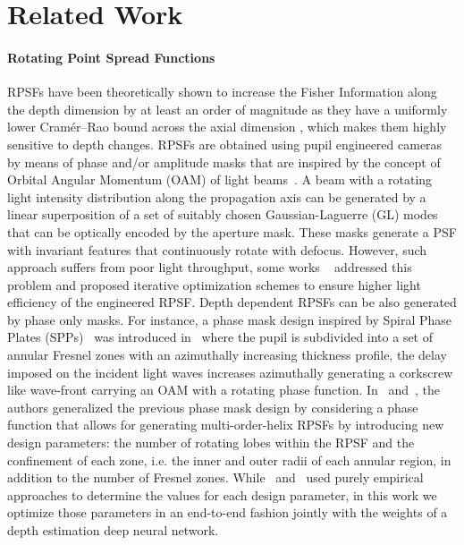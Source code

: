 \documentclass[preprint,5p,twocolumn]{elsarticle}
\begin{document}
 \section{Related Work}
\label{sec:related}






\paragraph{Rotating Point Spread Functions}
\label{parag:1}
RPSFs have been theoretically shown to increase the Fisher Information along the depth dimension by at least an order of magnitude as they have a uniformly lower Cramér–Rao bound across the axial dimension \cite{greengard2006depth}, which makes them highly sensitive to depth changes. RPSFs are obtained using pupil engineered cameras by means of phase and/or amplitude masks that are inspired by the concept of Orbital Angular Momentum (OAM) of light beams~\cite{allen1992orbital}. A beam with a rotating light intensity distribution along the propagation axis can be generated by a linear superposition of a set of suitably chosen Gaussian-Laguerre (GL) modes~\cite{piestun2000propagation,greengard2006depth} that can be optically encoded by the aperture mask. These masks generate a PSF with invariant features that continuously rotate with defocus. However, such approach suffers from poor light throughput, some works  ~\cite{pavani2008high,shechtman2014optimal} addressed this problem and proposed iterative optimization schemes to ensure higher light efficiency of the engineered RPSF. Depth dependent RPSFs can be also generated by phase only masks.
For instance, a phase mask design inspired by Spiral Phase Plates (SPPs)~\cite{kotlyar2005generation,kotlyar2006diffraction} was introduced in~\cite{prasad2013rotating} where the pupil is subdivided into a set of annular Fresnel zones with an azimuthally increasing thickness profile, the delay imposed on the incident light waves increases azimuthally generating a corkscrew like wave-front carrying an OAM with a rotating phase function.
In~\cite{berlich2018high} and~\cite{kumar2015three}, the authors generalized the previous phase mask design by considering  a phase function that allows for generating multi-order-helix RPSFs by introducing new design parameters: the number of rotating lobes within the RPSF and the confinement of each zone, i.e. the inner and outer radii of each annular region, in addition to the number of Fresnel zones. While~\cite{berlich2018high} and~\cite{kumar2015three} used purely empirical approaches to determine the values for each design parameter, in this work we optimize those parameters in an end-to-end fashion jointly with the weights of a depth estimation deep neural network. 
\end{document}
